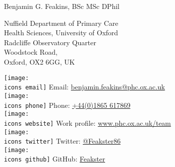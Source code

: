 \documentclass[10pt,a4paper]{article}
\def\icons{./icons/}
\def\name{Benjamin G. Feakins, BSc MSc DPhil}
\begin{document}
{\huge \name}

\vspace{0.25in}

\begin{minipage}[t]{0.5\textwidth}
  \raggedright
  Nuffield Department of Primary Care \\
  Health Sciences, University of Oxford \\
  Radcliffe Observatory Quarter \\
  Woodstock Road, \\
  Oxford, OX2 6GG, UK \\
\end{minipage}\begin{minipage}[t]{0.5\textwidth}
  \raggedright
  \texttt{[image: \\icons email]} Email: \href{mailto:benjamin.feakins@phc.ox.ac.uk}{benjamin.feakins@phc.ox.ac.uk} \\
  \texttt{[image: \\icons phone]} Phone: \href{tel:441865617869}{+44(0)1865 617869} \\
  \texttt{[image: \\icons website]} Work profile: \href{https://www.phc.ox.ac.uk/team/ben-feakins}{www.phc.ox.ac.uk/team} \\
  \texttt{[image: \\icons twitter]} Twitter:  \href{https://twitter.com/Feakster86}{@Feakster86} \\
  \texttt{[image: \\icons github]} GitHub: \href{https://github.com/Feakster}{Feakster} \\
\end{minipage}

\vspace{0.25in}

\sloppy
\end{document}
